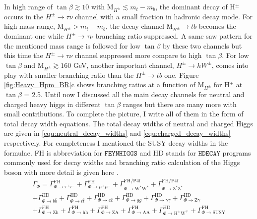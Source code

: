 In high range of $\tan\beta \gtrsim 10$ with M$_{H^{\pm}} \lesssim m_{t} - m_{b}$, the dominant decay of H$^{\pm}$ occurs in the $H^{\pm}\rightarrow \tau\nu$ channel with a small fraction in hadronic decay mode. For high mass range,  M$_{H^{\pm}} > m_{t} - m_{b}$, the decay channel M$_{H^{\pm}} \rightarrow tb$ becomes the dominant one while $H^{\pm}\rightarrow \tau\nu$ branching ratio suppressed. A same saw pattern for the mentioned mass range is followed for low $\tan\beta$ by these two channels but this time the $H^{\pm}\rightarrow \tau\nu$ channel suppressed more compare to high $\tan\beta$. For low $\tan\beta$ and M$_{H^{\pm}} \gtrsim 160 $ GeV, another important channel, $H^{\pm}\rightarrow hW^{\pm}$, comes into play with smaller branching ratio than the $H^{\pm}\rightarrow tb$ one. Figure \ref{fig:Heavy_Hpm_BR}c shows branching ratios at a function of M$_{H^{\pm}}$ for H$^{\pm}$ at $\tan\beta$ = 2.5. Until now I discussed all the main decay channels for neutral and charged heavy higgs in different $\tan\beta$ ranges but there are many more with small contributions. To complete the picture, I write all of them in the form of total decay width equations. The total decay widths of neutral and charged Higgs are given in \ref{equ:neutral_decay_widths} and \ref{equ:charged_decay_widths} respectively. For completeness I mentioned the SUSY decay widths in the formulae. FH is abbreviation for $\mathtt{FEYNHIGGS}$ and HD stands for $\mathtt{HDECAY}$ programs commonly used for decay widths and branching ratio calculation of the Higgs boson with more detail is given here \cite{Dittmaier:2012vm}.
\begin{equation}\label{equ:neutral_decay_widths}
\begin{split}
\Gamma_{\Phi} = \Gamma^{\text{FH}}_{\Phi \rightarrow\tau^{+}\tau^{-}} + \Gamma^{\text{FH}}_{\Phi \rightarrow\mu^{+}\mu^{-}} + \Gamma^{\text{FH/P4f}}_{\Phi \rightarrow \text{W}^{*}\text{W}^{*}} + \Gamma^{\text{FH/P4f}}_{\Phi \rightarrow \text{Z}^{*}\text{Z}^{*}}\\
+ \Gamma^{\text{HD}}_{\Phi \rightarrow b\bar{b}} + \Gamma^{\text{HD}}_{\Phi \rightarrow t\bar{t}} + \Gamma^{\text{HD}}_{\Phi \rightarrow c\bar{c}} + \Gamma^{\text{HD}}_{\Phi \rightarrow gg} + \Gamma^{\text{HD}}_{\Phi \rightarrow \gamma \gamma} + \Gamma^{\text{HD}}_{\Phi \rightarrow \text{Z} \gamma}\\
+ \Gamma^{\text{FH}}_{\Phi \rightarrow \text{Zh}} + \Gamma^{\text{FH}}_{\Phi \rightarrow \text{hh}} + \Gamma^{\text{FH}}_{\Phi \rightarrow \text{ZA}} + \Gamma^{\text{FH}}_{\Phi \rightarrow \text{AA}}  + \Gamma^{\text{HD}}_{\Phi \rightarrow \text{H}^{\pm}\text{W}^{\mp}} + \Gamma^{\text{FH}}_{\Phi \rightarrow \text{SUSY}}
\end{split}
\end{equation}
